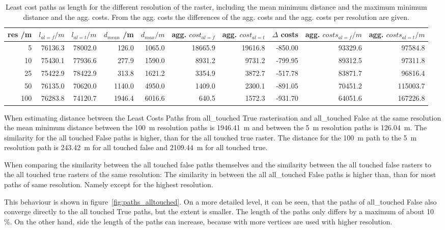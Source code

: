 \begin{table*}[t]
	\caption{Least cost paths as length for the different resolution of the raster, including the mean minimum distance and the maximum minimum distance and the agg. costs. From the agg. costs the differences of the agg. costs and the agg. costs per resolution are given.} 
	\label{tab:2}
	\centering
	\begin{tabular}{ r  r  r  r  r  r  r  r  r  r}
		res /m & $l_{al=f} /m$ & $l_{al=t} /m$ & $d_{mean}$ /m & $d_{max}/m$ & agg.  $ cost_{al=f}$ & agg. $ cost_{al=t}$ &  $\Delta $ costs & agg. $costs_{al=f} /m$ & agg. $costs_{al=t} /m$ \\
		\hline
		5 	& 76136.3	& 78002.0 &  126.0 & 1065.0 & 18665.9 & 19616.8 & -850.00 & 93329.6 &  97584.8 \\
		10 	& 75430.1 	& 77936.6 &  277.9 & 1590.0 &  8931.2 &  9731.2 & -799.95 & 89312.5 &  97311.8 \\
		25 	& 75422.9 	& 78422.9 &  313.8 & 1621.2 &  3354.9 &  3872.7 & -517.78 & 83871.7 &  96816.4 \\
		50 	& 76135.0	& 70620.0 & 1140.0 & 4950.0 &  1409.0 &  2300.1 & -891.05 & 70451.2 & 115003.7 \\
		100 & 76283.8	& 74120.7 & 1946.4 & 6016.6 &   640.5 &  1572.3 & -931.70 & 64051.6 & 167226.8 \\

	\end{tabular}
\end{table*}

When estimating distance between the Least Costs Paths from all\_touched True rasterisation and all\_touched False at the same resolution 
the mean minimum distance between the 100~m resolution paths is 1946.41~m and between the 5~m resolution paths is 126.04~m.
The similarity for the all touched False paths is higher, than for the all touched true raster.
The distance for the 100~m path to the 5~m resolution path is 243.42~m for all touched false and 2109.44~m for all touched true.

When comparing the similarity between the all touched false paths themselves and the similarity between the all touched false rasters to the all touched true rasters of the same resolution: The similarity in between the all all\_touched False paths is higher than, than for most paths of same resolution.
Namely except for the highest resolution.

This behaviour is shown in figure~\ref{fig:paths_alltouched}.
On a more detailed level, it can be seen, that the paths of all\_touched False also converge directly to the all touched True paths, but the extent is smaller.
The length of the paths only differs by a maximum of about 10 \%.
On the other hand, side the length of the paths can increase, because with more vertices are used with higher resolution.

